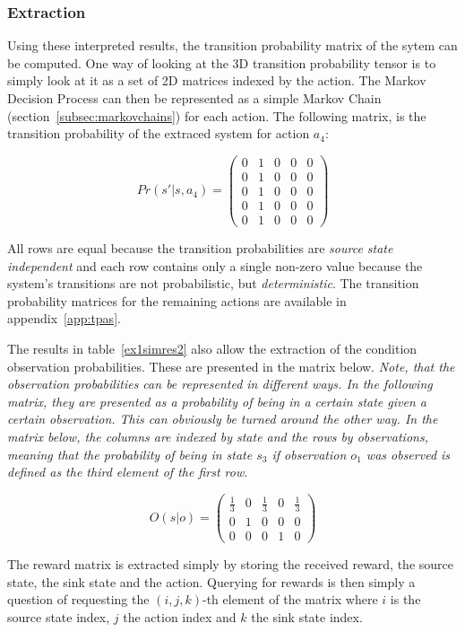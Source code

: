 \subsubsection{Extraction}

Using these interpreted results, the transition probability matrix of the sytem can be computed. One way of looking at the 3D transition probability tensor is to simply look at it as a set of 2D matrices indexed by the action. The Markov Decision Process can then be represented as a simple Markov Chain (section~\ref{subsec:markovchains}) for each action. The following matrix, is the transition probability of the extraced system for action $a_4$:

\[
Pr(s'|s,a_4) = 
\begin{pmatrix}
 0 & 1 & 0 & 0 & 0 \\
 0 & 1 & 0 & 0 & 0 \\
 0 & 1 & 0 & 0 & 0 \\
 0 & 1 & 0 & 0 & 0 \\
 0 & 1 & 0 & 0 & 0
\end{pmatrix}
\]

All rows are equal because the transition probabilities are \textit{source state independent} and each row contains only a single non-zero value because the system's transitions are not probabilistic, but \textit{deterministic}. The transition probability matrices for the remaining actions are available in appendix~\ref{app:tpas}.


The results in table~\ref{ex1simres2} also allow the extraction of the condition observation probabilities. These are presented in the matrix below. \textit{Note, that the observation probabilities can be represented in different ways. In the following matrix, they are presented as a probability of being in a certain state given a certain observation. This can obviously be turned around the other way. In the matrix below, the columns are indexed by state and the rows by observations, meaning that the probability of being in state $s_3$ if observation $o_1$ was observed is defined as the third element of the first row}.

\[
O(s|o) = 
\begin{pmatrix}
 \frac{1}{3} & 0 & \frac{1}{3} & 0 & \frac{1}{3} \\
 0 & 1 & 0 & 0 & 0 \\
 0 & 0 & 0 & 1 & 0
\end{pmatrix}
\]

The reward matrix is extracted simply by storing the received reward, the source state, the sink state and the action. Querying for rewards is then simply a question of requesting the $(i,j,k)$-th element of the matrix where $i$ is the source state index, $j$ the action index and $k$ the sink state index.

